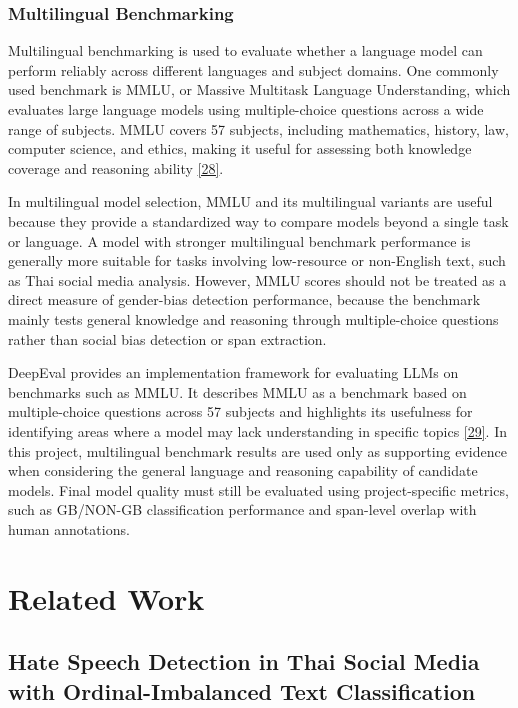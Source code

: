 \documentclass[12pt,oneside,openright,a4paper]{cpe-english-project}
\begin{document}
\subsubsection{Multilingual Benchmarking}

Multilingual benchmarking is used to evaluate whether a language model can perform reliably across different languages and subject domains. One commonly used benchmark is MMLU, or Massive Multitask Language Understanding, which evaluates large language models using multiple-choice questions across a wide range of subjects. MMLU covers 57 subjects, including mathematics, history, law, computer science, and ethics, making it useful for assessing both knowledge coverage and reasoning ability \hyperlink{bib:ref28}{[28]}.

In multilingual model selection, MMLU and its multilingual variants are useful because they provide a standardized way to compare models beyond a single task or language. A model with stronger multilingual benchmark performance is generally more suitable for tasks involving low-resource or non-English text, such as Thai social media analysis. However, MMLU scores should not be treated as a direct measure of gender-bias detection performance, because the benchmark mainly tests general knowledge and reasoning through multiple-choice questions rather than social bias detection or span extraction.

DeepEval provides an implementation framework for evaluating LLMs on benchmarks such as MMLU. It describes MMLU as a benchmark based on multiple-choice questions across 57 subjects and highlights its usefulness for identifying areas where a model may lack understanding in specific topics \hyperlink{bib:ref29}{[29]}. In this project, multilingual benchmark results are used only as supporting evidence when considering the general language and reasoning capability of candidate models. Final model quality must still be evaluated using project-specific metrics, such as GB/NON-GB classification performance and span-level overlap with human annotations.

\section{Related Work}

\subsection{Hate Speech Detection in Thai Social Media with Ordinal-Imbalanced Text Classification}
\end{document}
